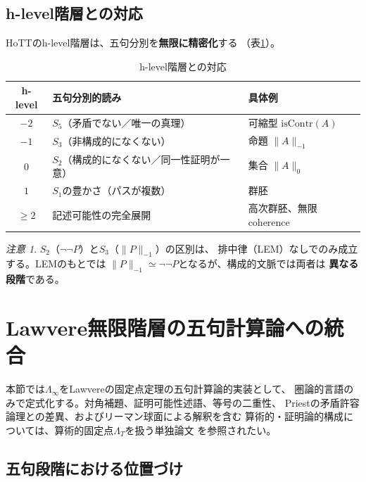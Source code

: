 \documentclass[11pt,a4paper]{ltjsarticle}
\theoremstyle{remark}
\newtheorem*{remark}{注意}
\newcommand{\isContr}{\mathrm{isContr}}
\newcommand{\LawvereInfinity}{\Lambda_\infty}
\newcommand{\ArithmeticFixedPoint}{\Lambda_T}
\begin{document}
\subsection{h-level階層との対応}

HoTTのh-level階層は、五句分別を\textbf{無限に精密化}する
（表\ref{tab:hlevel}）。

\begin{table}[htbp]
\centering
\caption{h-level階層との対応}
\label{tab:hlevel}
\small
\begin{tabularx}{\textwidth}{@{}c >{\raggedright\arraybackslash}X >{\raggedright\arraybackslash}X@{}}
\toprule
h-level & 五句分別的読み & 具体例 \\
\midrule
$-2$ & $S_5$（矛盾でない／唯一の真理） & 可縮型 $\isContr(A)$ \\
$-1$ & $S_3$（非構成的になくない） & 命題 $\lVert A\rVert_{-1}$ \\
$0$ & $S_2$（構成的になくない／同一性証明が一意） & 集合 $\lVert A\rVert_0$ \\
$1$ & $S_1$の豊かさ（パスが複数） & 群胚 \\
$\geq 2$ & 記述可能性の完全展開 & 高次群胚、無限coherence \\
\bottomrule
\end{tabularx}
\end{table}

\begin{remark}
$S_2$（$\neg\neg P$）と$S_3$（$\lVert P\rVert_{-1}$）の区別は、
排中律（LEM）なしでのみ成立する。LEMのもとでは
$\lVert P\rVert_{-1}\simeq\neg\neg P$となるが、構成的文脈では両者は
\textbf{異なる段階}である。
\end{remark}

\section{Lawvere無限階層の五句計算論への統合}
\label{sec:lambda-infinity}

本節では$\LawvereInfinity$をLawvereの固定点定理の五句計算論的実装として、
圏論的言語のみで定式化する。対角補題、証明可能性述語、等号の二重性、
Priestの矛盾許容論理との差異、およびリーマン球面による解釈を含む
算術的・証明論的構成については、算術的固定点$\ArithmeticFixedPoint$を扱う単独論文
\cite{ChibaLambda2026}を参照されたい。

\subsection{五句段階における位置づけ}
\end{document}
